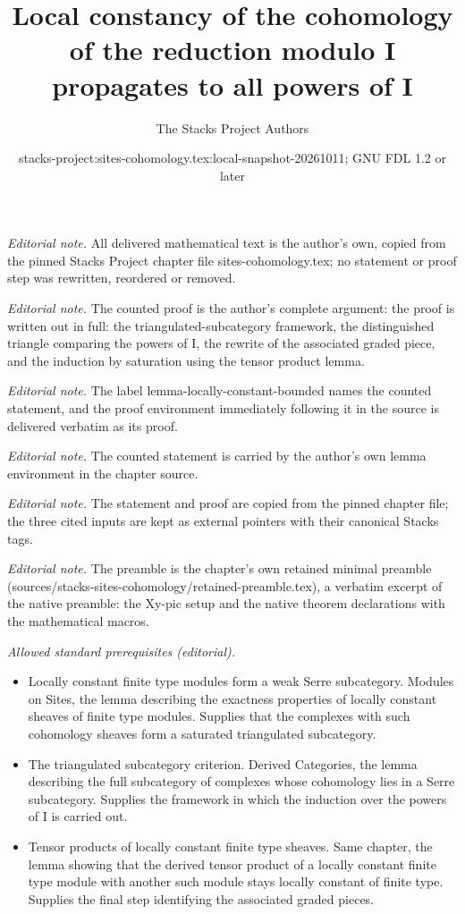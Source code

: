 \documentclass[10pt,a4paper]{amsart}
\title{Local constancy of the cohomology of the reduction modulo I propagates to all powers of I}
\author{The Stacks Project Authors}
\date{stacks-project:sites-cohomology.tex:local-snapshot-20261011; GNU FDL 1.2 or later}
\theoremstyle{plain}
\theoremstyle{definition}
\theoremstyle{remark}
\numberwithin{equation}{subsection}
\begin{document}
\maketitle
\noindent\textit{Editorial note.} All delivered mathematical text is the author's own, copied from the pinned Stacks Project chapter file sites-cohomology.tex; no statement or proof step was rewritten, reordered or removed.\par\medskip
\noindent\textit{Editorial note.} The counted proof is the author's complete argument: the proof is written out in full: the triangulated-subcategory framework, the distinguished triangle comparing the powers of I, the rewrite of the associated graded piece, and the induction by saturation using the tensor product lemma.\par\medskip
\noindent\textit{Editorial note.} The label lemma-locally-constant-bounded names the counted statement, and the proof environment immediately following it in the source is delivered verbatim as its proof.\par\medskip
\noindent\textit{Editorial note.} The counted statement is carried by the author's own lemma environment in the chapter source.\par\medskip
\noindent\textit{Editorial note.} The statement and proof are copied from the pinned chapter file; the three cited inputs are kept as external pointers with their canonical Stacks tags.\par\medskip
\noindent\textit{Editorial note.} The preamble is the chapter's own retained minimal preamble (sources/stacks-sites-cohomology/retained-preamble.tex), a verbatim excerpt of the native preamble: the Xy-pic setup and the native theorem declarations with the mathematical macros.\par\medskip
\noindent\textit{Allowed standard prerequisites (editorial).}\begin{itemize}
\item Locally constant finite type modules form a weak Serre subcategory. Modules on Sites, the lemma describing the exactness properties of locally constant sheaves of finite type modules. Supplies that the complexes with such cohomology sheaves form a saturated triangulated subcategory.
\item The triangulated subcategory criterion. Derived Categories, the lemma describing the full subcategory of complexes whose cohomology lies in a Serre subcategory. Supplies the framework in which the induction over the powers of I is carried out.
\item Tensor products of locally constant finite type sheaves. Same chapter, the lemma showing that the derived tensor product of a locally constant finite type module with another such module stays locally constant of finite type. Supplies the final step identifying the associated graded pieces.
\end{itemize}\medskip
\end{document}
